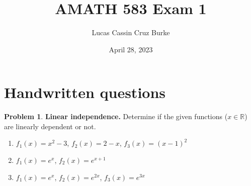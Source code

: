 \documentclass[12pt,a4paper]{article}
\title{AMATH 583 Exam 1}
\author{Lucas Cassin Cruz Burke}
\date{April 28, 2023}
\theoremstyle{definition}
\newtheorem{problem}{Problem}
\theoremstyle{remark}
\begin{document}
\maketitle

\section{Handwritten questions}
\begin{problem}
    \textbf{Linear independence.} Determine if the given functions ($x\in \mathbb R$) are linearly dependent or not.

    \begin{enumerate}
        \item $f_1(x) = x^2-3$, $f_2(x) = 2-x$, $f_3(x)=(x-1)^2$
        \item $f_1(x)=e^x$, $f_2(x)=e^{x+1}$
        \item $f_1(x)=e^x$, $f_2(x)=e^{2x}$, $f_3(x)=e^{3x}$
    \end{enumerate}
\end{problem}
\end{document}
